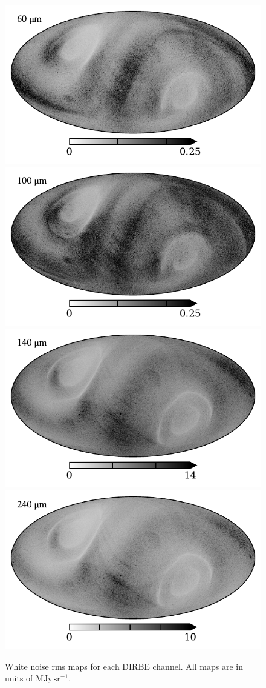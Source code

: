 \documentclass{aa}
\begin{document}
\begin{figure}
  \includegraphics[width=0.37\linewidth]{figs/rms_maps/rms_07.pdf}
  \includegraphics[width=0.37\linewidth]{figs/rms_maps/rms_08.pdf}\\       
  \includegraphics[width=0.37\linewidth]{figs/rms_maps/rms_09.pdf}
  \includegraphics[width=0.37\linewidth]{figs/rms_maps/rms_10.pdf}       
	\caption{White noise rms maps for each DIRBE channel. All maps are in units of $\mathrm{MJy\,sr^{-1}}$.}
  \label{fig:sigma0_map}
\end{figure}
\end{document}

